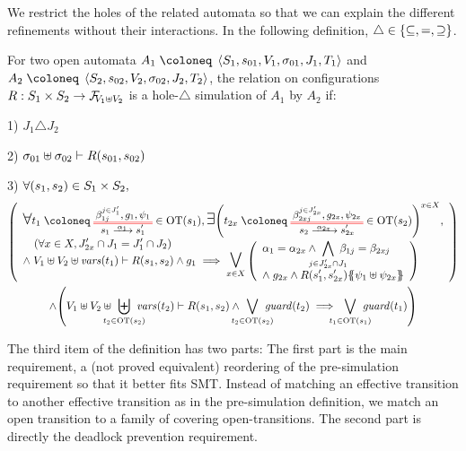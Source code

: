 \documentclass{article}
\begin{document}
We restrict the holes of the related automata so that we can explain the different refinements without their interactions.
In the following definition, \(\triangle \in \mbrc{\subseteq, =, \supseteq}\).
\begin{defi}
For two open automata \(A_1 \defobject \OAg[1]\) and \(A_2 \defobject \OAg[2]\), the relation on configurations \(R: S_1 \times S_2 \to \rformulas[V_1 \uplus V_2]\) is a hole-\(\triangle\) simulation of \(A_1\) by \(A_2\) if:
\item[1)] \(J_1 \triangle J_2\)
\item[2)] \(\sigma_{01} \uplus \sigma_{02} \vdash R\mpar{s_{01}, s_{02}}\)
\item[3)] \(\forall \mpar{s_1, s_2} \in S_1 \times S_2,\)\vspace{-8pt}
\noindent\begin{multline*}
	\mpar{\everymath{\displaystyle}\begin{array}{l}
		\bigsymb{\forall} t_1 \defobject \OTx{1}{}{1}{1} \in \fOT{s_1}, \bigsymb{\exists} \mpar{t_{2x} \defobject \OTx{2}{x}{2x}{2x} \in \fOT{s_2}}^{x \in X}, \\
		\quad \mpar{\forall x \in X, J'_{2x} \cap J_1 = J'_1 \cap J_2} \\[-10pt]
		\nwedge V_1 \uplus V_2 \uplus \fvars{t_1} \vdash R\mpar{s_1, s_2} \wedge g_1 \implies \operatorname*{\bigsymb{\bigvee}}_{x \in X} \mpar{\begin{array}{l}
			\alpha_1 = \alpha_{2x} \wedge \bigwedge_\subbox{j \in J'_{2x} \cap J_1} \beta_{1j} = \beta_{2xj} \\[12pt]
			\nwedge g_{2x} \wedge R\mpar{s'_1, s'_{2x}}\psubst{\psi_1 \uplus \psi_{2x}}
		\end{array}}
	\end{array}} \\
	\wedge \mpar{V_1 \uplus V_2 \uplus \biguplus_\subbox{t_2 \in \fOT{s_2}} \fvars{t_2} \vdash R\mpar{s_1, s_2} \wedge \bigvee_\subbox{t_2 \in \fOT{s_2}} \fguard{t_2} \implies \bigvee_\subbox{t_1 \in \fOT{s_1}} \fguard{t_1}}
\end{multline*}
\end{defi}
The third item of the definition has two parts:
The first part is the main requirement, a (not proved equivalent) reordering of the pre-simulation requirement so that it better fits SMT.
Instead of matching an effective transition to another effective transition as in the pre-simulation definition, we match an open transition to a family of covering open-transitions.
The second part is directly the deadlock prevention requirement.
\end{document}
